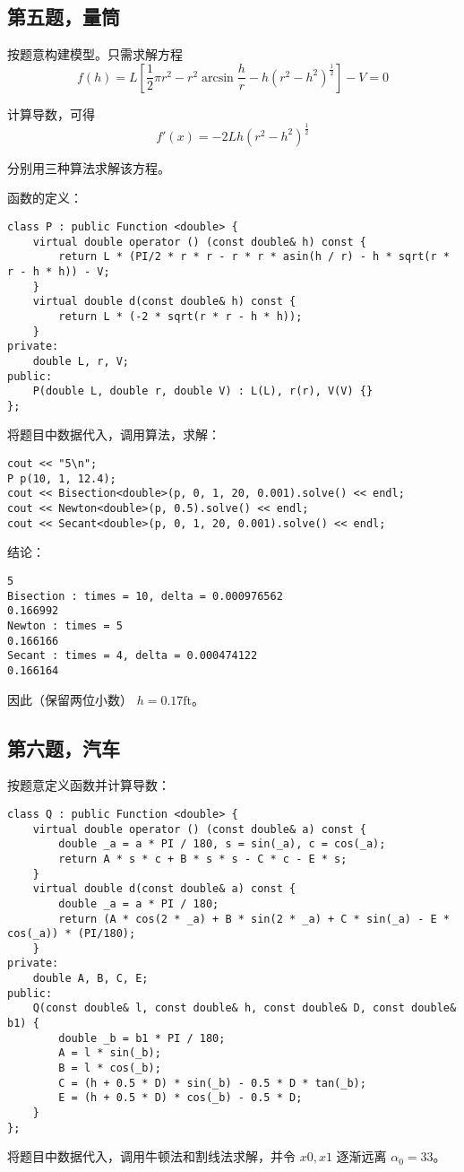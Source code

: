 \documentclass{ctexart}
\begin{document}
\subsection{第五题，量筒}
按题意构建模型。只需求解方程
\begin{equation}
    f(h)=L[\dfrac 12\pi r^2-r^2\arcsin \dfrac hr-h(r^2-h^2)^{\frac 12}]-V=0
\end{equation}

计算导数，可得
\begin{equation}
    f'(x)=-2Lh(r^2-h^2)^{\frac 12}
\end{equation}

分别用三种算法求解该方程。

函数的定义：
\begin{verbatim}
class P : public Function <double> {
    virtual double operator () (const double& h) const {
        return L * (PI/2 * r * r - r * r * asin(h / r) - h * sqrt(r * r - h * h)) - V;
    }
    virtual double d(const double& h) const {
        return L * (-2 * sqrt(r * r - h * h));
    }
private:
    double L, r, V;
public:
    P(double L, double r, double V) : L(L), r(r), V(V) {}
};
\end{verbatim}

将题目中数据代入，调用算法，求解：
\begin{verbatim}
cout << "5\n";
P p(10, 1, 12.4);
cout << Bisection<double>(p, 0, 1, 20, 0.001).solve() << endl;
cout << Newton<double>(p, 0.5).solve() << endl;
cout << Secant<double>(p, 0, 1, 20, 0.001).solve() << endl;
\end{verbatim}

结论：
\begin{verbatim}
5
Bisection : times = 10, delta = 0.000976562
0.166992
Newton : times = 5
0.166166
Secant : times = 4, delta = 0.000474122
0.166164
\end{verbatim}

因此（保留两位小数） $h=0.17\text{ft}$。

\subsection{第六题，汽车}
按题意定义函数并计算导数：
\begin{verbatim}
class Q : public Function <double> {
    virtual double operator () (const double& a) const {
        double _a = a * PI / 180, s = sin(_a), c = cos(_a);
        return A * s * c + B * s * s - C * c - E * s;
    }
    virtual double d(const double& a) const {
        double _a = a * PI / 180;
        return (A * cos(2 * _a) + B * sin(2 * _a) + C * sin(_a) - E * cos(_a)) * (PI/180);
    }
private:
    double A, B, C, E;
public:
    Q(const double& l, const double& h, const double& D, const double& b1) {
        double _b = b1 * PI / 180;
        A = l * sin(_b);
        B = l * cos(_b);
        C = (h + 0.5 * D) * sin(_b) - 0.5 * D * tan(_b);
        E = (h + 0.5 * D) * cos(_b) - 0.5 * D;
    }
};
\end{verbatim}
将题目中数据代入，调用牛顿法和割线法求解，并令 $x0,x1$ 逐渐远离 $\alpha_0=33$。
\end{document}
